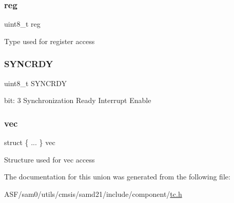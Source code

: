 \subsubsection{\texorpdfstring{reg}{reg}}
{\footnotesize\ttfamily uint8\+\_\+t reg}

Type used for register access \mbox{\label{union_t_c___i_n_t_e_n_s_e_t___type_aece75e176e4fd55bf68937f1b56bde63}} 
\subsubsection{\texorpdfstring{SYNCRDY}{SYNCRDY}}
{\footnotesize\ttfamily uint8\+\_\+t S\+Y\+N\+C\+R\+DY}

bit\+: 3 Synchronization Ready Interrupt Enable \mbox{\label{union_t_c___i_n_t_e_n_s_e_t___type_a014f8b210bd8ef90828fdbb7df2c874c}} 
\subsubsection{\texorpdfstring{vec}{vec}}
{\footnotesize\ttfamily struct \{ ... \}   vec}

Structure used for vec access 

The documentation for this union was generated from the following file\+:\begin{DoxyCompactItemize}
\item 
A\+S\+F/sam0/utils/cmsis/samd21/include/component/\mbox{\hyperlink{utils_2cmsis_2samd21_2include_2component_2tc_8h}{tc.\+h}}\end{DoxyCompactItemize}
